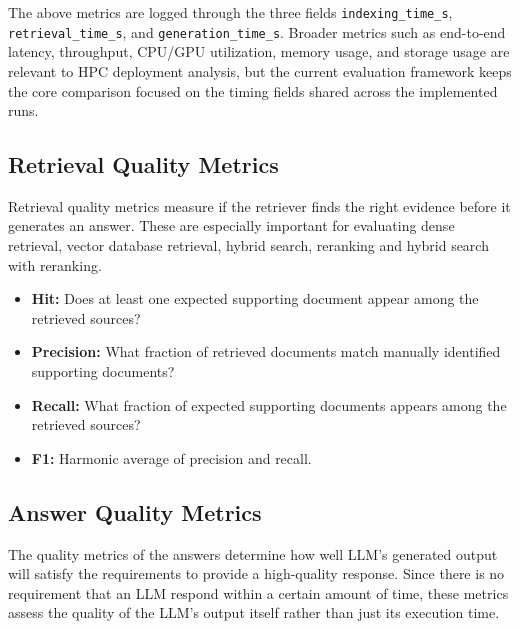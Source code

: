 The above metrics are logged through the three fields \texttt{indexing\_time\_s}, \texttt{retrieval\_time\_s}, and \texttt{generation\_time\_s}. Broader metrics such as end-to-end latency, throughput, CPU/GPU utilization, memory usage, and storage usage are relevant to \ac{HPC} deployment analysis, but the current evaluation framework keeps the core comparison focused on the timing fields shared across the implemented runs.


\subsection{Retrieval Quality Metrics}

Retrieval quality metrics measure if the retriever finds the right evidence before it generates an answer. These are especially important for evaluating dense retrieval, vector database retrieval, hybrid search, reranking and hybrid search with reranking.

\begin{itemize}
    \item \textbf{Hit:} Does at least one expected supporting document appear among the retrieved sources?
    \item \textbf{Precision:} What fraction of retrieved documents match manually identified supporting documents?
    \item \textbf{Recall:} What fraction of expected supporting documents appears among the retrieved sources?
    \item \textbf{F1:} Harmonic average of precision and recall.
\end{itemize}

\subsection{Answer Quality Metrics}

The quality metrics of the answers determine how well \ac{LLM}'s generated output will satisfy the requirements to provide a high-quality response. Since there is no requirement that an \ac{LLM} respond within a certain amount of time, these metrics assess the quality of the \ac{LLM}'s output itself rather than just its execution time.

